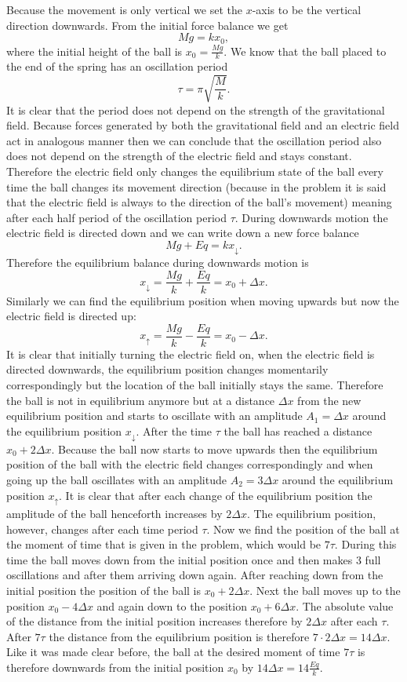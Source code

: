 \documentclass[11pt]{article}
\begin{document}

\solueng
Because the movement is only vertical we set the $x$-axis to be the vertical direction downwards. From the initial force balance we get
$$Mg = kx_0,$$
where the initial height of the ball is $x_0 = \frac{Mg}{k}$. We know that the ball placed to the end of the spring has an oscillation period
$$\tau = \pi \sqrt{\frac{M}{k}}.$$ 
It is clear that the period does not depend on the strength of the gravitational field. Because forces generated by both the gravitational field and an electric field act in analogous manner then we can conclude that the oscillation period also does not depend on the strength of the electric field and stays constant. Therefore the electric field only changes the equilibrium state of the ball every time the ball changes its movement direction (because in the problem it is said that the electric field is always to the direction of the ball’s movement) meaning after each half period of the oscillation period $\tau$. During downwards motion the electric field is directed down and we can write down a new force balance
$$Mg + Eq = kx_\downarrow.$$ 
Therefore the equilibrium balance during downwards motion is 
$$x_\downarrow = \frac{Mg}{k} + \frac{Eq}{k} = x_0 + \Delta x.$$ 
Similarly we can find the equilibrium position when moving upwards but now the electric field is directed up:
$$x_\uparrow = \frac{Mg}{k} - \frac{Eq}{k} = x_0 - \Delta x.$$ 
It is clear that initially turning the electric field on, when the electric field is directed downwards, the equilibrium position changes momentarily correspondingly but the location of the ball initially stays the same. Therefore the ball is not in equilibrium anymore but at a distance $\Delta x$ from the new equilibrium position and starts to oscillate with an amplitude $A_1 = \Delta x$ around the equilibrium position $x_\downarrow$. After the time $\tau$ the ball has reached a distance $x_0 + 2\Delta x$. Because the ball now starts to move upwards then the equilibrium position of the ball with the electric field changes correspondingly and when going up the ball oscillates with an amplitude $A_2 = 3 \Delta x$ around the equilibrium position $x_\uparrow$. It is clear that after each change of the equilibrium position the amplitude of the ball henceforth increases by $2 \Delta x$. The equilibrium position, however, changes after each time period $\tau$. Now we find the position of the ball at the moment of time that is given in the problem, which would be $7 \tau$. During this time the ball moves down from the initial position once and then makes $3$ full oscillations and after them arriving down again. After reaching down from the initial position the position of the ball is $x_0 + 2 \Delta x $. Next the ball moves up to the position $x_0 - 4 \Delta x$ and again down to the position $x_0 + 6 \Delta x$. The absolute value of the distance from the initial position increases therefore by $2 \Delta x$ after each $\tau$. After $7 \tau$ the distance from the equilibrium position is therefore $7 \cdot 2 \Delta x = 14 \Delta x$. Like it was made clear before, the ball at the desired moment of time $7 \tau$ is therefore downwards from the initial position $x_0$ by $14 \Delta x = 14 \frac{Eq}{k}$.
\end{document}

